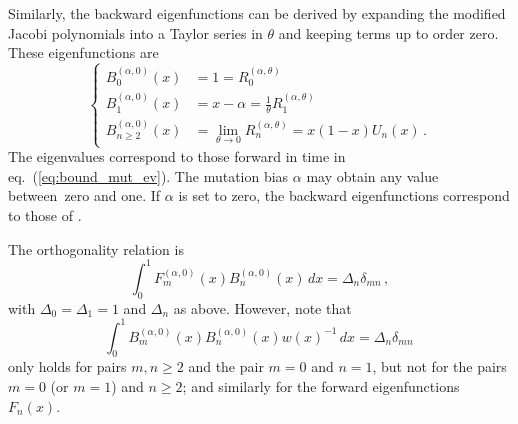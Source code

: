 \documentclass[preprint]{elsarticle}
\begin{document}
Similarly, the backward eigenfunctions can be derived by expanding the modified Jacobi polynomials into a Taylor series in $\theta$ and keeping terms up to order zero. These eigenfunctions are 
\begin{equation}\label{eq:backw_Us}
\begin{cases}
    B_0^{(\alpha,0)}(x)&=1=R_0^{(\alpha,\theta)}\\
    B_1^{(\alpha,0)}(x)&=x-\alpha=\frac{1}{\theta}R_1^{(\alpha,\theta)}\\
    B_{n\geq2}^{(\alpha,0)}(x)&=\lim_{\theta\to0}R_n^{(\alpha,\theta)}=x(1-x)U_n(x)\,.
\end{cases}
\end{equation}
The eigenvalues correspond to those forward in time in eq.~(\ref{eq:bound_mut_ev}). The mutation bias $\alpha$ may obtain any value between zero and one. If $\alpha$ is set to zero, the backward eigenfunctions correspond to those of \citet{Tran14b}. 

The orthogonality relation is 
\begin{equation}\label{eq:ortho_rel_pure_drift}
\int_0^1 F_m^{(\alpha,0)}(x) B_n^{(\alpha,0)}(x)\,dx=\Delta_n \delta_{mn}\,,
\end{equation}
with $\Delta_0=\Delta_1=1$ and $\Delta_n$ as above. However, note that 
\begin{equation}
\int_0^1 B_m^{(\alpha,0)}(x) B_n^{(\alpha,0)}(x) w(x)^{-1} \,dx=\Delta_n \delta_{mn}\,
\end{equation}
only holds for pairs $m,n\geq 2$ and the pair $m=0$ and $n=1$, but not for the pairs $m=0$ (or $m=1$) and $n\geq 2$; and similarly for the forward eigenfunctions $F_n(x)$. %
\end{document}
